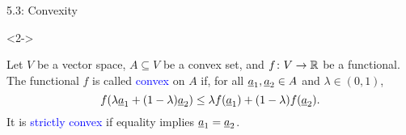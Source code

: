 \documentclass[10pt,english,aspectratio=169]{beamer}
\begin{document}
\begin{frame}{5.3: Convexity}
\begin{definition}<2->
\begin{minipage}{0.70\textwidth}
Let $V$ be a vector space, $A \subseteq V$ be a convex set, and $f \colon V \rightarrow \mathbb{R}$ be a functional.
The functional $f$ is called \textcolor{blue}{convex} on $A$ if, for all $\underline{a}_1,\underline{a}_2 \in A$ and $\lambda\in(0,1)$, \vspace{-1mm}
\[ f( \lambda \vecnot{a}_1 + (1-\lambda) \vecnot{a}_2 ) \leq \lambda f( \vecnot{a}_1 ) + (1-\lambda) f ( \vecnot{a}_2 ). \vspace{-1mm} \]
It is \textcolor{blue}{strictly convex} if equality implies $\underline{a}_1 = \underline{a}_2$.
\end{minipage}\hspace{-3mm}
\begin{minipage}{0.29\textwidth}
\end{minipage}
\end{definition}

\end{frame}
\end{document}
